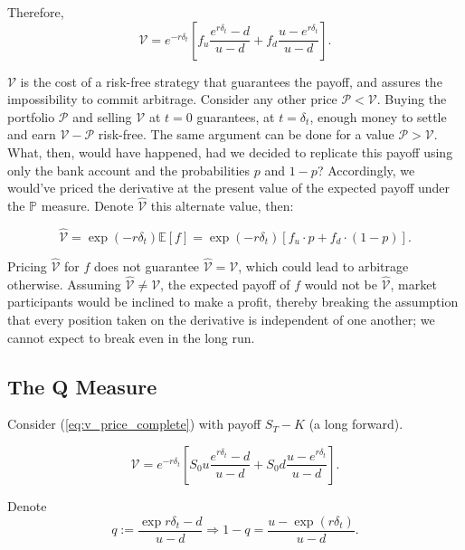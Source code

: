 \documentclass[../TGMAFFIRO.tex]{subfiles}
\begin{document}
Therefore,
\begin{equation} \label{eq:v_price_complete}
	\mathcal{V} = e^{-r\delta_t}\left[f_u \frac{e^{r\delta_t} - d}{u - d} + f_d \frac{u - e^{r\delta_t}}{u-d}\right].
\end{equation}

$\mathcal{V}$ is the cost of a risk-free strategy that guarantees the payoff, and assures the impossibility to commit arbitrage. Consider any other price $\mathcal{P} < \mathcal{V}$. Buying the portfolio $\mathcal{P}$ and selling $\mathcal{V}$ at $t=0$ guarantees, at $t=\delta_t$, enough money to settle and earn $\mathcal{V}-\mathcal{P}$ risk-free. The same argument can be done for a value $\mathcal{P} > \mathcal{V}$.\\

What, then, would have happened, had we decided to replicate this payoff using only the bank account and the probabilities $p$ and $1-p$? Accordingly, we would've priced the derivative at the present value of the expected payoff under the $\mathbb{P}$ measure. Denote $\hat{\mathcal{V}}$ this alternate value, then:

\begin{equation}
    \hat{\mathcal{V}} = \exp(-r\delta_t)\mathbb{E}[f] = \exp(-r\delta_t)[f_u \cdot p + f_d \cdot (1- p) ].
\end{equation}


Pricing $\hat{\mathcal{V}}$ for $f$ does not guarantee $\hat{\mathcal{V}} = \mathcal{V}$, which could lead to arbitrage otherwise. Assuming $\hat{\mathcal{V}} \neq \mathcal{V}$, the expected payoff of $f$ would not be $\hat{\mathcal{V}}$, market participants would be inclined to make a profit, thereby breaking the assumption that every position taken on the derivative is independent of one another; we cannot expect to break even in the long run.


\subsection{The Q Measure}
Consider  (\ref{eq:v_price_complete}) with payoff $S_T - K$ (a long forward).

\begin{equation*}
    \mathcal{V} = e^{-r\delta_t}\left[S_0u \frac{e^{r\delta_t} - d}{u - d} + S_0d \frac{u - e^{r\delta_t}}{u-d}\right].
\end{equation*}

Denote
\begin{equation}
    q:= \frac{\exp{r\delta_t} - d}{u - d} \Longrightarrow 1-q = \frac{u - \exp{(r\delta_t)}}{u-d}.
\end{equation}\\
\end{document}
